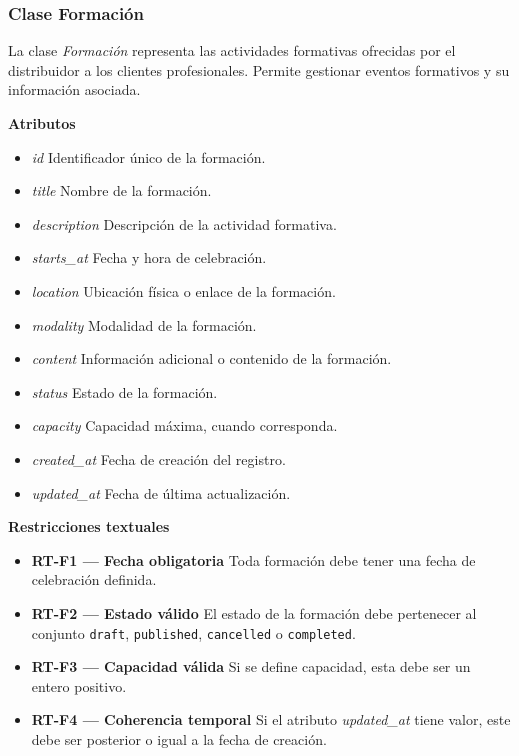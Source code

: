 \subsubsection{Clase Formación}

La clase \textit{Formación} representa las actividades formativas ofrecidas por el distribuidor a los clientes profesionales. Permite gestionar eventos formativos y su información asociada.

\textbf{Atributos}

\begin{itemize}

      \item \textit{id}
            Identificador único de la formación.
      \item \textit{title}
            Nombre de la formación.
      \item \textit{description}
            Descripción de la actividad formativa.
      \item \textit{starts\_at}
            Fecha y hora de celebración.
      \item \textit{location}
            Ubicación física o enlace de la formación.
      \item \textit{modality}
            Modalidad de la formación.
      \item \textit{content}
            Información adicional o contenido de la formación.
      \item \textit{status}
            Estado de la formación.
      \item \textit{capacity}
            Capacidad máxima, cuando corresponda.
      \item \textit{created\_at}
            Fecha de creación del registro.
      \item \textit{updated\_at}
            Fecha de última actualización.

\end{itemize}

\textbf{Restricciones textuales}

\begin{itemize}

      \item \textbf{RT-F1 — Fecha obligatoria}
            Toda formación debe tener una fecha de celebración definida.
      \item \textbf{RT-F2 — Estado válido}
            El estado de la formación debe pertenecer al conjunto \texttt{draft}, \texttt{published}, \texttt{cancelled} o \texttt{completed}.
      \item \textbf{RT-F3 — Capacidad válida}
            Si se define capacidad, esta debe ser un entero positivo.
      \item \textbf{RT-F4 — Coherencia temporal}
            Si el atributo \textit{updated\_at} tiene valor, este debe ser posterior o igual a la fecha de creación.

\end{itemize}


